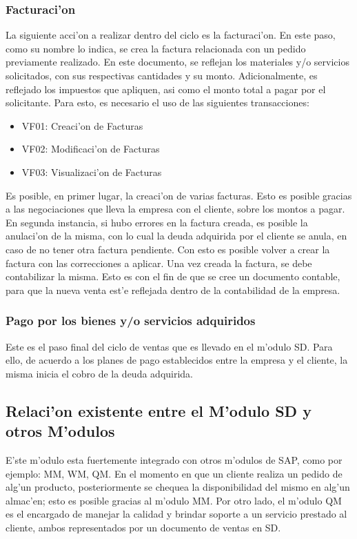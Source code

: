 \subsubsection{Facturaci'on}
	La siguiente acci'on a realizar dentro del ciclo es la facturaci'on. En este paso, como su nombre lo indica, se crea la factura relacionada con un pedido previamente realizado. En este documento, se reflejan los materiales y/o servicios solicitados, con sus respectivas cantidades y su monto. Adicionalmente, es reflejado los impuestos que apliquen, asi como  el monto total a pagar por el solicitante. Para esto, es necesario el uso de las siguientes transacciones:
\begin{itemize}
\item VF01: Creaci'on de Facturas
\item VF02: Modificaci'on de Facturas
\item VF03: Visualizaci'on de Facturas
\end{itemize}
	Es posible, en primer lugar, la creaci'on de varias facturas. Esto es posible gracias a las negociaciones que lleva la empresa con el cliente, sobre los montos a pagar. En segunda instancia, si hubo errores en la factura creada, es posible la anulaci'on de la misma, con lo cual la deuda adquirida por el cliente se anula, en caso de no tener otra factura pendiente. Con esto es posible volver a crear la factura con las correcciones a aplicar. 
	Una vez creada la factura, se debe contabilizar la misma. Esto es con el fin de que se cree un documento contable, para que la nueva venta est'e reflejada dentro de la contabilidad de la empresa.
	
\subsubsection{Pago por los bienes y/o servicios adquiridos}
	Este es el paso final del ciclo de ventas que es llevado en el m'odulo SD. Para ello, de acuerdo a los planes de pago establecidos entre la empresa y el cliente, la misma inicia el cobro de la deuda adquirida.
	

\subsection{Relaci'on existente entre el M'odulo SD y otros M'odulos}
E'ste m'odulo esta fuertemente integrado con otros m'odulos de SAP, como por ejemplo: MM, WM, QM. 
En el momento en que un cliente realiza un pedido de alg'un producto, posteriormente se chequea la disponibilidad del mismo en alg'un almac'en; esto es posible gracias al m'odulo MM. 
Por otro lado, el m'odulo QM es el encargado de manejar la calidad y brindar soporte a un servicio prestado al cliente, ambos representados por un documento de ventas en SD. 

